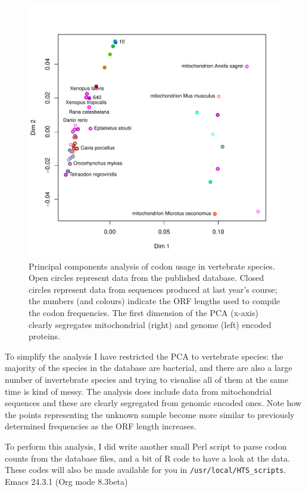\documentclass[11pt]{article}
\begin{document}
\begin{figure}[htb]
\centering
\includegraphics[width=14cm]{CodonFrequency_PCA.pdf}
\caption{\label{fig:codonpca}Principal components analysis of codon usage in vertebrate species. Open circles represent data from the published database. Closed circles represent data from sequences produced at last year's course; the numbers (and colours) indicate the ORF lengths used to compile the codon frequencies. The first dimension of the PCA (x-axis) clearly segregates mitochondrial (right) and genome (left) encoded proteins.}
\end{figure}


To simplify the analysis I have restricted the PCA to vertebrate species: the majority of the
species in the database are bacterial, and there are also a large number of invertebrate species and
trying to visualise all of them at the same time is kind of messy. The analysis does include 
data from mitochondrial sequences
and these are clearly segregated from genomic encoded ones. Note how the points representing
the unknown sample become more similar to previously determined frequencies as the ORF length
increases.

To perform this analysis, I did write another small Perl script to parse codon counts from
the database files, and a bit of R code to have a look at the data. These codes will also
be made available for you in \texttt{/usr/local/HTS\_scripts}.
Emacs 24.3.1 (Org mode 8.3beta)
\end{document}
